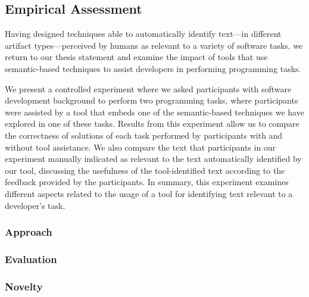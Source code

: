 

\subsection{Empirical Assessment}



Having designed techniques able to automatically identify text---in different artifact types---perceived by humans
as relevant to a variety of software tasks, we return to our thesis statement
and examine the impact of tools that use semantic-based techniques to assist developers in performing programming 
tasks. 



We present a controlled experiment where we asked participants with software development background to 
perform two programming tasks, where participants were assisted by a tool
that embeds one of the semantic-based techniques we have explored in one of these tasks.
Results from this experiment allow us to compare the correctness of solutions of each task 
performed by participants with and without tool assistance. 
We also compare the text that participants in our experiment manually indicated as relevant to the text automatically identified by our tool, discussing the usefulness of the tool-identified text according to the feedback provided by the participants. In summary, this experiment examines different aspects related to 
the usage of a tool for identifying text relevant to a developer's task.



\subsubsection{Approach}



\subsubsection{Evaluation}



\subsubsection{Novelty}